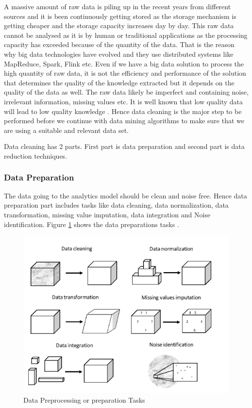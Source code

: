 \documentclass[sigconf]{acmart}
\begin{document}
A massive amount of raw data is piling up in the recent years from different sources and it is been continuously getting stored as the storage mechanism is getting cheaper and the storage capacity increases day by day. This raw data cannot be analysed as it is by human or traditional applications as the processing capacity has exceeded because of the quantity of the data. That is the reason why big data technologies have evolved and they use distributed systems like MapReduce, Spark, Flink etc. Even if we have a big data solution to process the high quantity of raw data, it is not the efficiency and performance of the solution that determines the quality of the knowledge extracted but it depends on the quality of the data as well. The raw data likely be imperfect and containing noise, irrelevant information, missing values etc. It is well known that low quality data will lead to low quality knowledge \cite{preprocessing}. Hence data cleaning is the major step to be performed before we continue with data mining algorithms to make sure that we are using a suitable and relevant data set. 

Data cleaning has 2 parts. First part is data preparation and second part is data reduction techniques. 

\subsubsection{Data Preparation}

The data going to the analytics model should be clean and noise free. Hence data preparation part includes tasks like data cleaning, data normalization, data transformation, missing value imputation, data integration and Noise identification. Figure \ref{fig:Figure4} shows the data preparations tasks \cite{preprocessing}.

\begin{figure}[htb]
  \centering
  \includegraphics[width=1.0\columnwidth]{project/images/Figure4.png}
  \caption{Data Preprocessing or preparation Tasks
  \cite{preprocessing}}
  \label{fig:Figure4} 
\end{figure}
\end{document}
